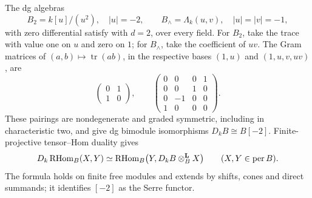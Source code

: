 \begin{example}\label{ex:negative-cy-algebras}
The dg algebras
\[
 B_2=k[u]/(u^2),\quad |u|=-2,
 \qquad
 B_{\wedge}=\Lambda_k(u,v),\quad |u|=|v|=-1,
\]
with zero differential satisfy  with \(d=2\), over every field.  For \(B_2\), take the trace with value one on \(u\) and zero on \(1\); for \(B_{\wedge}\), take the coefficient of \(uv\).  The Gram matrices of \((a,b)\mapsto\operatorname{tr}(ab)\), in the respective bases \((1,u)\) and \((1,u,v,uv)\), are
\[
 \begin{pmatrix}0&1\\1&0\end{pmatrix},
 \qquad
 \begin{pmatrix}0&0&0&1\\0&0&1&0\\0&-1&0&0\\1&0&0&0\end{pmatrix}.
\]
These pairings are nondegenerate and graded symmetric, including in characteristic two, and give dg bimodule isomorphisms \(D_kB\cong B[-2]\).  Finite-projective tensor--Hom duality gives
\[
 D_k\operatorname{RHom}_B(X,Y)\simeq
 \operatorname{RHom}_B\bigl(Y,D_kB\otimes^{\mathbf L}_BX\bigr)
 \qquad(X,Y\in\operatorname{per} B).
\]
The formula holds on finite free modules and extends by shifts, cones and direct summands; it identifies \([-2]\) as the Serre functor.
\end{example}

